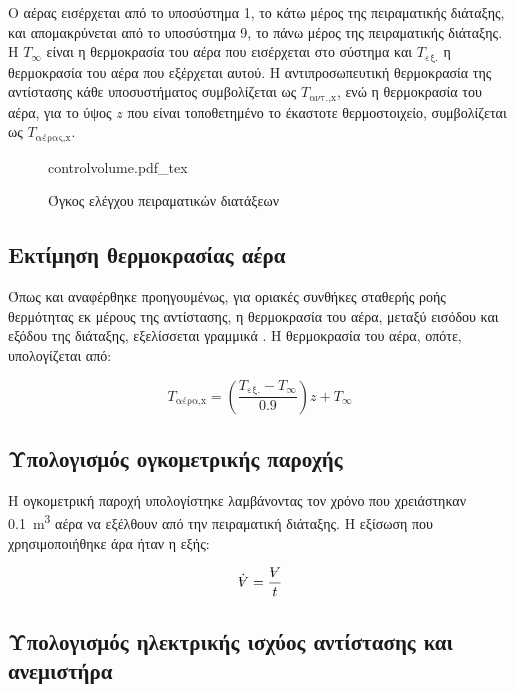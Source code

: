 Ο αέρας εισέρχεται από το υποσύστημα 1, το κάτω μέρος της πειραματικής διάταξης, και απομακρύνεται από το υποσύστημα 9, το πάνω μέρος της πειραματικής διάταξης. Η $T_{\infty}$ είναι η θερμοκρασία του αέρα που εισέρχεται στο σύστημα και $T_{\text{εξ.}}$ η θερμοκρασία του αέρα που εξέρχεται αυτού. H αντιπροσωπευτική θερμοκρασία της αντίστασης κάθε υποσυστήματος  συμβολίζεται ως $T_{\text{αντ.,x}}$, ενώ η θερμοκρασία του αέρα, για το ύψος $z$ που είναι τοποθετημένο το έκαστοτε θερμοστοιχείο, συμβολίζεται ως $T_{\text{αέρας,x}}$.

\begin{figure}[hbp]
\centering
{controlvolume.pdf_tex}
\caption{Όγκος ελέγχου πειραματικών διατάξεων}
\label{fig:controlvolume}
\end{figure}

\clearpage

\subsection{Εκτίμηση θερμοκρασίας αέρα}

\noindent Όπως και αναφέρθηκε προηγουμένως, για οριακές συνθήκες σταθερής ροής θερμότητας εκ μέρους της αντίστασης, η θερμοκρασία του αέρα, μεταξύ εισόδου και εξόδου της διάταξης, εξελίσσεται γραμμικά \cite{2011_Bergman_BOOK}. Η θερμοκρασία του αέρα, οπότε, υπολογίζεται από:

\begin{equation}\label{eq:tempair}
T_{\text{αέρα,x}} = \left(\displaystyle\frac{T_{\text{εξ.}} - T_{\infty}}{0.9}\right)z + T_{\infty}
\end{equation}


\subsection{Υπολογισμός ογκομετρικής παροχής}

\noindent Η ογκομετρική παροχή υπολογίστηκε λαμβάνοντας τον χρόνο που χρειάστηκαν \qty{0.1}{\metre\cubed} αέρα να εξέλθουν από την πειραματική διάταξης. Η εξίσωση που χρησιμοποιήθηκε άρα ήταν η εξής: 

\begin{equation}\label{eq:floww}
\dot{\volume} = \frac{\volume}{t}
\end{equation}

\subsection{Υπολογισμός ηλεκτρικής ισχύος αντίστασης και ανεμιστήρα}

